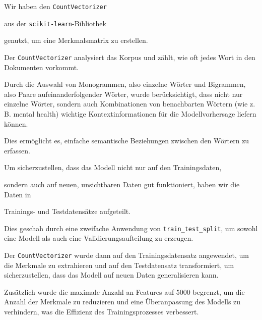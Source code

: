Wir haben den \texttt{CountVectorizer} 

aus der \texttt{scikit-learn}-Bibliothek 

genutzt, um eine Merkmalsmatrix zu erstellen. 

Der \texttt{CountVectorizer} analysiert das Korpus und zählt, wie oft jedes Wort in den Dokumenten vorkommt. 

Durch die Auswahl von Monogrammen, also einzelne Wörter und Bigrammen, also Paare aufeinanderfolgender Wörter, wurde berücksichtigt, dass nicht nur einzelne Wörter, sondern auch Kombinationen von benachbarten Wörtern (wie z.\,B. mental health) wichtige Kontextinformationen für die Modellvorhersage liefern können.

Dies ermöglicht es, einfache semantische Beziehungen zwischen den Wörtern zu erfassen.

Um sicherzustellen, dass das Modell nicht nur auf den Trainingsdaten, 

sondern auch auf neuen, unsichtbaren Daten gut funktioniert, haben wir die Daten in

Trainings- und Testdatensätze aufgeteilt.

Dies geschah durch eine zweifache Anwendung von \verb|train_test_split|, um sowohl eine Modell als auch eine Validierungsaufteilung zu erzeugen. 

Der \verb|CountVectorizer| wurde dann auf den Trainingsdatensatz angewendet, um die Merkmale zu extrahieren und auf den Testdatensatz transformiert, um sicherzustellen, dass das Modell auf neuen Daten generalisieren kann.

Zusätzlich wurde die maximale Anzahl an Features auf 5000 begrenzt, um die Anzahl der Merkmale zu reduzieren und eine Überanpassung des Modells zu verhindern, was die Effizienz des Trainingsprozesses verbessert.